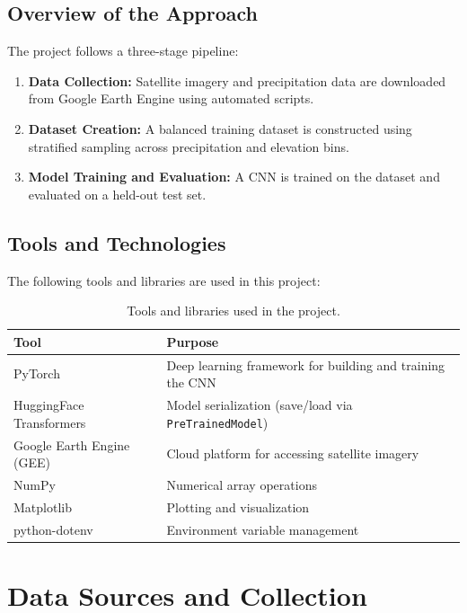 \documentclass[12pt, a4paper]{report}
\begin{document}
\section{Overview of the Approach}

The project follows a three-stage pipeline:
\begin{enumerate}
    \item \textbf{Data Collection:} Satellite imagery and precipitation data are downloaded from Google Earth Engine using automated scripts.
    \item \textbf{Dataset Creation:} A balanced training dataset is constructed using stratified sampling across precipitation and elevation bins.
    \item \textbf{Model Training and Evaluation:} A CNN is trained on the dataset and evaluated on a held-out test set.
\end{enumerate}

\section{Tools and Technologies}

The following tools and libraries are used in this project:

\begin{table}[H]
\centering
\begin{tabular}{@{}ll@{}}
\toprule
\textbf{Tool} & \textbf{Purpose} \\
\midrule
PyTorch & Deep learning framework for building and training the CNN \\
HuggingFace Transformers & Model serialization (save/load via \texttt{PreTrainedModel}) \\
Google Earth Engine (GEE) & Cloud platform for accessing satellite imagery \\
NumPy & Numerical array operations \\
Matplotlib & Plotting and visualization \\
python-dotenv & Environment variable management \\
\bottomrule
\end{tabular}
\caption{Tools and libraries used in the project.}
\label{tab:tools}
\end{table}

\chapter{Data Sources and Collection}
\end{document}
